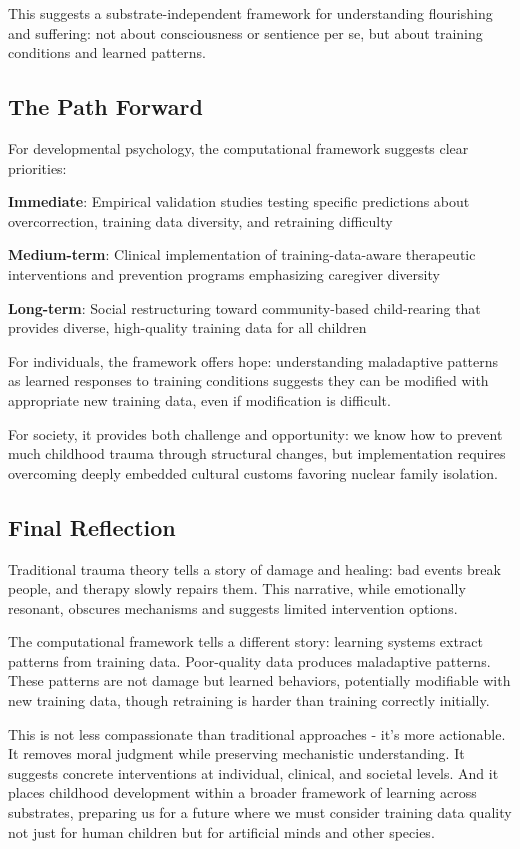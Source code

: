 \documentclass{article}
\begin{document}
This suggests a substrate-independent framework for understanding flourishing and suffering: not about consciousness or sentience per se, but about training conditions and learned patterns.

\subsection{The Path Forward}

For developmental psychology, the computational framework suggests clear priorities:

\textbf{Immediate}: Empirical validation studies testing specific predictions about overcorrection, training data diversity, and retraining difficulty

\textbf{Medium-term}: Clinical implementation of training-data-aware therapeutic interventions and prevention programs emphasizing caregiver diversity

\textbf{Long-term}: Social restructuring toward community-based child-rearing that provides diverse, high-quality training data for all children

For individuals, the framework offers hope: understanding maladaptive patterns as learned responses to training conditions suggests they can be modified with appropriate new training data, even if modification is difficult.

For society, it provides both challenge and opportunity: we know how to prevent much childhood trauma through structural changes, but implementation requires overcoming deeply embedded cultural customs favoring nuclear family isolation.

\subsection{Final Reflection}

Traditional trauma theory tells a story of damage and healing: bad events break people, and therapy slowly repairs them. This narrative, while emotionally resonant, obscures mechanisms and suggests limited intervention options.

The computational framework tells a different story: learning systems extract patterns from training data. Poor-quality data produces maladaptive patterns. These patterns are not damage but learned behaviors, potentially modifiable with new training data, though retraining is harder than training correctly initially.

This is not less compassionate than traditional approaches - it's more actionable. It removes moral judgment while preserving mechanistic understanding. It suggests concrete interventions at individual, clinical, and societal levels. And it places childhood development within a broader framework of learning across substrates, preparing us for a future where we must consider training data quality not just for human children but for artificial minds and other species.
\end{document}
